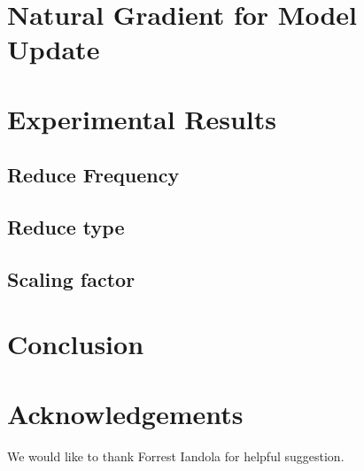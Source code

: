 \documentclass{article}
\begin{document}
\section{Natural Gradient for Model Update}

\section{Experimental Results}
\subsection{Reduce Frequency}

\subsection{Reduce type}

\subsection{Scaling factor}

\section{Conclusion}


\section{Acknowledgements}
We would like to thank Forrest Iandola for helpful suggestion.



\end{document}
